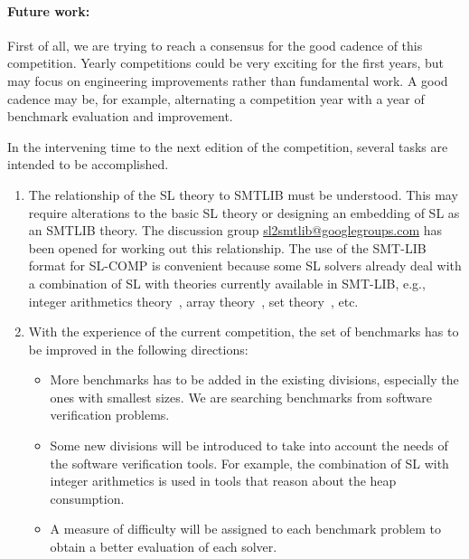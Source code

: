 \documentclass[twoside,11pt]{article}
\begin{document}
\paragraph{Future work:}
First of all, we are trying to reach a consensus for the good cadence of this competition. Yearly competitions could be very exciting for the first years, but may focus on engineering improvements rather than fundamental work. 
A good cadence may be, for example, alternating a competition year with a year of benchmark evaluation and improvement.

In the intervening time to the next edition of the competition, several tasks are intended to be accomplished.
\begin{enumerate}

\item The relationship of the SL theory to SMTLIB must be understood. This may require alterations to
the basic SL theory or designing an embedding of SL as an SMTLIB theory.
The discussion group \url{sl2smtlib@googlegroups.com} has been opened for working out this relationship. 
The use of the SMT-LIB format for SL-COMP is convenient because some SL solvers already deal with a combination of SL with theories currently available in SMT-LIB, e.g., 
integer arithmetics theory~\cite{PerezR11}, array theory~\cite{BouajjaniDES12-vmcai}, set theory~\cite{PiskacWZ13}, etc.


\item With the experience of the current competition, the set of benchmarks has to be improved in the following directions:
\begin{itemize}
\item More benchmarks has to be added in the existing divisions, especially the ones with smallest sizes. 
We are searching benchmarks from software verification problems.

\item Some new divisions will be introduced to take into account the needs of the software verification tools. For example, the combination of SL with integer arithmetics is used in tools that reason about the heap consumption.

\item A measure of difficulty will be assigned to each benchmark problem to obtain a better evaluation of each solver.
\end{itemize}


\end{enumerate}
\end{document}
